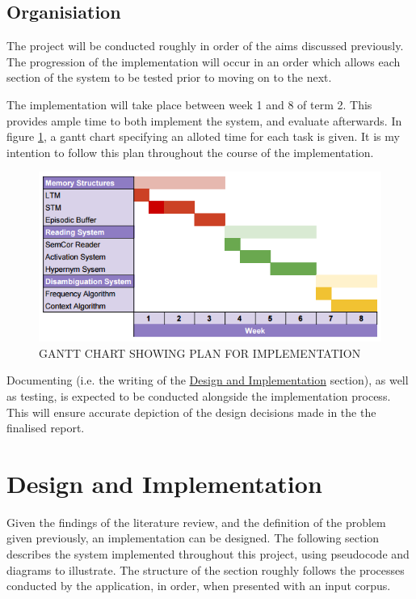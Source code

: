 \documentclass[]{article}
\begin{document}
\subsection{Organisiation}
\label{PAOrganisation}
The project will be conducted roughly in order of the aims discussed previously. The progression of the implementation will occur in an order which allows each section of the system to be tested prior to moving on to the next.

The implementation will take place between week 1 and 8 of term 2. This provides ample time to both implement the system, and evaluate afterwards. In figure \ref{fig:gantt}, a gantt chart specifying an alloted time for each task is given. It is my intention to follow this plan throughout the course of the implementation.

\begin{figure}[h]
	\includegraphics[scale=0.5]{gantt.png}
	\caption{GANTT CHART SHOWING PLAN FOR IMPLEMENTATION}
	\label{fig:gantt}
\end{figure}

Documenting (i.e. the writing of the \hyperref[sec:Implementation]{Design and Implementation} section), as well as testing, is expected to be conducted alongside the implementation process. This will ensure accurate depiction of the design decisions made in the the finalised report.


\section{Design and Implementation}
\label{sec:Implementation}
Given the findings of the literature review, and the definition of the problem given previously, an implementation can be designed. The following section describes the system implemented throughout this project, using pseudocode and diagrams to illustrate. The structure of the section roughly follows the processes conducted by the application, in order, when presented with an input corpus.
\end{document}
